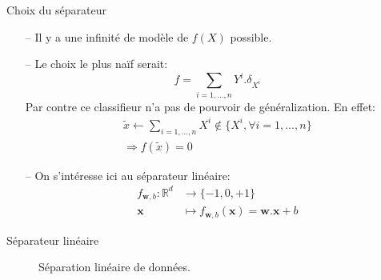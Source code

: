 \documentclass[9pt]{beamer}
\begin{document}
	\begin{frame}{Choix du séparateur}
		\begin{itemize}
			\item[--] Il y a une infinité de modèle de $f(X)$ possible.
			\item[--] Le choix le plus naïf serait:
			\begin{equation*}
				f = \sum_{i=1,\dots,n} Y^i . \delta_{X^i}
			\end{equation*}
			Par contre ce classifieur n'a pas de pourvoir de généralization. En effet:
			\begin{gather*}
				\widetilde{x} \leftarrow \sum_{i=1,\dots,n} X^i \notin \{X^i, \forall i=1,\dots,n\} \\
				\Rightarrow f(\widetilde{x}) = 0
			\end{gather*}
			\item[--] On s'intéresse ici au séparateur linéaire:
			\begin{align*}
				f_{\textbf{w}, b}: \mathbb{R}^d &\rightarrow \{-1, 0, +1\} \\
				\textbf{x} &\mapsto f_{\textbf{w}, b}(\textbf{x}) = \textbf{w}.\textbf{x} + b
			\end{align*}
		\end{itemize}
	\end{frame}

	\begin{frame}{Séparateur linéaire}
		\begin{figure}[H]
			{
				\caption{\label{fig::lin_separators} Séparation linéaire de données.}
			}
		\end{figure}
	\end{frame}
\end{document}

